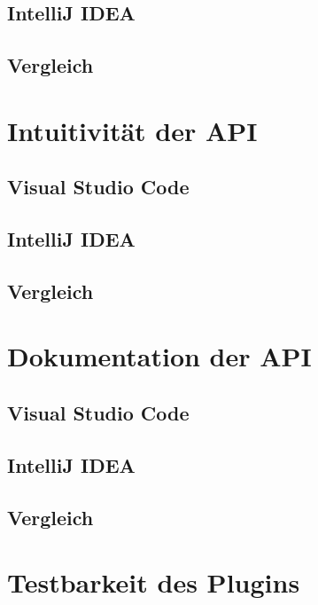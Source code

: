 \subsection{IntelliJ IDEA}

\subsection{Vergleich}


\section{Intuitivität der API}
\label{sec:Vergleich_Intuitivität}

\subsection{Visual Studio Code}

\subsection{IntelliJ IDEA}

\subsection{Vergleich}


\section{Dokumentation der API}
\label{sec:Vergleich_Dokumentation}

\subsection{Visual Studio Code}

\subsection{IntelliJ IDEA}

\subsection{Vergleich}


\section{Testbarkeit des Plugins}
\label{sec:Vergleich_Testbarkeit}

